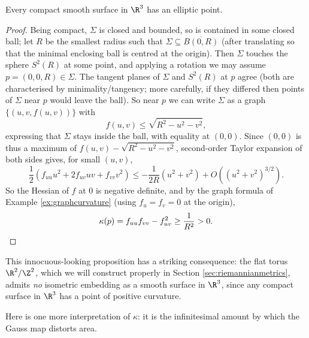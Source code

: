 \begin{proposition}\label{prop:ellipticpoint}
    Every compact smooth surface in $\R^3$ has an elliptic point.
\end{proposition}
\begin{proof}
    Being compact, $\Sigma$ is closed and bounded, so is contained in some closed ball; let $R$ be the smallest radius such that $\Sigma \subseteq \overline{B(0, R)}$ (after translating so that the minimal enclosing ball is centred at the origin). Then $\Sigma$ touches the sphere $S^2(R)$ at some point, and applying a rotation we may assume $p = (0, 0, R) \in \Sigma$. The tangent planes of $\Sigma$ and $S^2(R)$ at $p$ agree (both are characterised by minimality/tangency; more carefully, if they differed then points of $\Sigma$ near $p$ would leave the ball). So near $p$ we can write $\Sigma$ as a graph $\{(u, v, f(u,v))\}$ with
    $$
    f(u, v) \leq \sqrt{R^2 - u^2 - v^2},
    $$
    expressing that $\Sigma$ stays inside the ball, with equality at $(0,0)$. Since $(0,0)$ is thus a maximum of $f(u,v) - \sqrt{R^2 - u^2 - v^2}$, second-order Taylor expansion of both sides gives, for small $(u, v)$,
    $$
    \frac{1}{2}\left(f_{uu} u^2 + 2 f_{uv} uv + f_{vv} v^2 \right) \leq -\frac{1}{2R}(u^2 + v^2) + O((u^2+v^2)^{3/2}).
    $$
    So the Hessian of $f$ at $0$ is negative definite, and by the graph formula of Example \ref{ex:graphcurvature} (using $f_u = f_v = 0$ at the origin),
    $$
    \kappa(p) = f_{uu}f_{vv} - f_{uv}^2 \geq \frac{1}{R^2} > 0. \qedhere
    $$
\end{proof}

This innocuous-looking proposition has a striking consequence: the flat torus $\R^2/\Z^2$, which we will construct properly in Section \ref{sec:riemannianmetrics}, admits \emph{no} isometric embedding as a smooth surface in $\R^3$, since any compact surface in $\R^3$ has a point of positive curvature.

Here is one more interpretation of $\kappa$: it is the infinitesimal amount by which the Gauss map distorts area.

